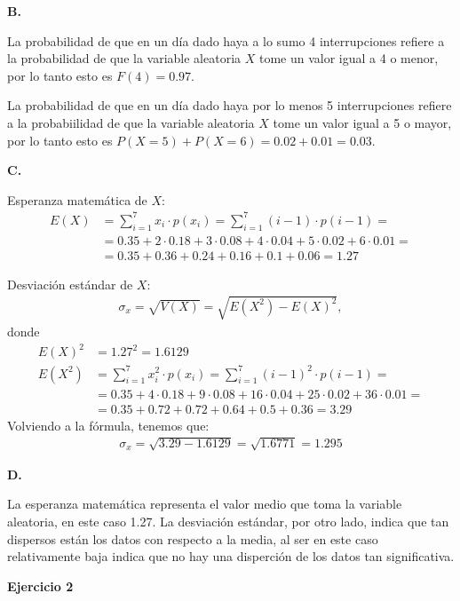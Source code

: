 \documentclass[11pt]{article}
\begin{document}
\textbf{B.} \par
La probabilidad de que en un día dado haya a lo sumo 4 interrupciones refiere a la probabilidad de que la variable aleatoria $X$ tome un valor igual a 4 o menor, por lo tanto esto es $F(4) = 0.97$. \par
La probabilidad de que en un día dado haya por lo menos 5 interrupciones refiere a la probabiilidad de que la variable aleatoria $X$ tome un valor igual a 5 o mayor, por lo tanto esto es $P(X=5) + P(X=6) = 0.02 + 0.01 = 0.03$.


\textbf{C.} \par
Esperanza matemática de $X$:
\begin{align*}
    E(X)& = \sum_{i=1}^{7} x_i \cdot p(x_i) = \sum_{i=1}^{7} (i-1) \cdot p(i-1) = \\
        & = 0.35 + 2 \cdot 0.18 + 3 \cdot 0.08 + 4 \cdot 0.04 + 5 \cdot 0.02 + 6 \cdot 0.01 = \\
        & = 0.35 + 0.36 + 0.24 + 0.16 + 0.1 + 0.06 = 1.27
\end{align*}

Desviación estándar de $X$:
\begin{align*}
    \sigma_x = \sqrt{V(X)} = \sqrt{E(X^2) - E(X)^2},
\end{align*}
donde
\begin{align*}
    E(X)^2 & = 1.27^2 = 1.6129 \\
    E(X^2) & = \sum_{i=1}^{7} x_i^2 \cdot p(x_i) = \sum_{i=1}^{7} (i-1)^2 \cdot p(i-1) = \\
           & = 0.35 + 4 \cdot 0.18 + 9 \cdot 0.08 + 16 \cdot 0.04 + 25 \cdot 0.02 + 36 \cdot 0.01 = \\
           & = 0.35 + 0.72 + 0.72 + 0.64 + 0.5 + 0.36 = 3.29
\end{align*}
Volviendo a la fórmula, tenemos que:
\begin{align*}
    \sigma_x = \sqrt{3.29 - 1.6129} = \sqrt{1.6771} = 1.295
\end{align*}

\textbf{D.} \par

La esperanza matemática representa el valor medio que toma la variable aleatoria, en este caso 1.27.
La desviación estándar, por otro lado, indica que tan dispersos están los datos con respecto a la media, al ser en este caso relativamente baja indica que no hay una disperción de los datos tan significativa.


\textbf{Ejercicio 2}
\end{document}
